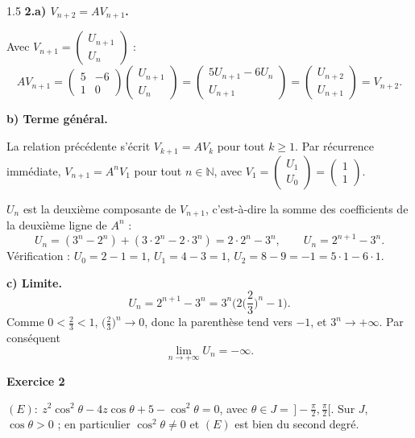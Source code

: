 \documentclass[12pt]{article}
\begin{document}
\begin{spacing}{1.5}
\textbf{2.a) $V_{n+2}=AV_{n+1}$.}

Avec $V_{n+1}=\begin{pmatrix}U_{n+1}\\U_n\end{pmatrix}$ :
\[
AV_{n+1}=\begin{pmatrix}5&-6\\1&0\end{pmatrix}\begin{pmatrix}U_{n+1}\\U_n\end{pmatrix}=\begin{pmatrix}5U_{n+1}-6U_n\\U_{n+1}\end{pmatrix}=\begin{pmatrix}U_{n+2}\\U_{n+1}\end{pmatrix}=V_{n+2}.
\]

\textbf{b) Terme général.}

La relation précédente s'écrit $V_{k+1}=AV_k$ pour tout $k\ge1$. Par récurrence immédiate, $V_{n+1}=A^nV_1$ pour tout $n\in\mathbb{N}$, avec $V_1=\begin{pmatrix}U_1\\U_0\end{pmatrix}=\begin{pmatrix}1\\1\end{pmatrix}$.

$U_n$ est la deuxième composante de $V_{n+1}$, c'est-à-dire la somme des coefficients de la deuxième ligne de $A^n$ :
\[
U_n=(3^n-2^n)+(3\cdot2^n-2\cdot3^n)=2\cdot2^n-3^n,\qquad\boxed{U_n=2^{n+1}-3^n}.
\]
Vérification : $U_0=2-1=1$, $U_1=4-3=1$, $U_2=8-9=-1=5\cdot1-6\cdot1$.


\textbf{c) Limite.}
\[
U_n=2^{n+1}-3^n=3^n\Big(2\Big(\frac23\Big)^n-1\Big).
\]
Comme $0<\frac23<1$, $\big(\frac23\big)^n\to0$, donc la parenthèse tend vers $-1$, et $3^n\to+\infty$. Par conséquent
\[
\boxed{\lim_{n\to+\infty}U_n=-\infty}.
\]

\medskip\textbf{Exercice 2}

$(E):\ z^2\cos^2\theta-4z\cos\theta+5-\cos^2\theta=0$, avec $\theta\in J=\,]-\frac\pi2,\frac\pi2[$. Sur $J$, $\cos\theta>0$ ; en particulier $\cos^2\theta\neq0$ et $(E)$ est bien du second degré.


\end{spacing}
\end{document}
